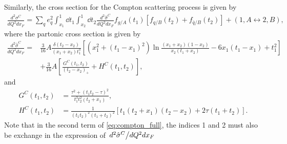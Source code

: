 Similarly, the cross section for the Compton scattering process is given by 
\begin{multline}
	\frac{d^2\sigma^C}{dQ^2dx_{F}} = \sum_q e^2_q \int^1_{x_1} \dd{t_1} \int^1_{x_2} \dd{t_2}
	\frac{d^2\hat{\sigma}^{C}}{dQ^2dx_F} f_{g/A}\left(t_1\right)
	\left[f_{q/B}\left(t_2\right) +f_{\bar{q}/B}\left(t_2\right) \right] + \left(1,A\leftrightarrow 2,B\right),
	\label{eq:compton_full}
\end{multline}
where the partonic cross section is given by
\begin{equation}
	\begin{split}
		\frac{d^2\hat{\sigma}^{C}}{dQ^2dx_F} =&\frac{3}{16} A \frac{\delta\left(t_2-x_2\right)}{\left(x_1+x_2\right)t_1^3}\left[ \left(x_1^2+\left(t_1-x_1\right)^2\right)\ln\frac{\left(x_1+x_2\right)\left(1-x_2\right)}{x_2\left(t_1+x_2\right)} - 6x_1\left(t_1-x_1\right)+t_1^2\right]\\
		&+\frac{3}{16}A\left[\frac{G^C\left(t_1,t_2\right)}{\left(t_2-x_2\right)_{+}} + H^C \left(t_1,t_2\right) \right],
	\end{split}
\end{equation}
and
\begin{align}
	G^C\left(t_1,t_2\right) &= \frac{\tau^2+\left(t_1t_2-\tau\right)^2}{t_1^3t_2^2\left(t_2+x_1\right)},\\
	H^C\left(t_1,t_2\right) &= \frac{1}{\left(t_1t_2\right)^2\left(t_1+t_2\right)^2}\left[t_1\left(t_2+x_1\right)\left(t_2-x_2\right)+2\tau\left(t_1+t_2\right)\right].
\end{align}
Note that in the second term of \cref{eq:compton_full}, the indices 1 and 2 must also be exchange in
the expression of $\flatfrac{d^2\hat{\sigma}^{C}}{dQ^2dx_F}$